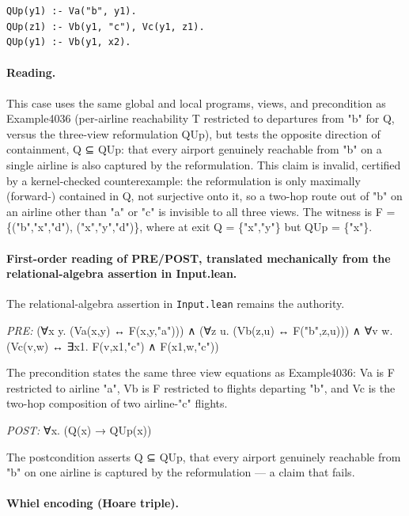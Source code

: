 \documentclass[10pt]{article}
\begin{document}
\begin{Verbatim}[fontsize=\scriptsize,breaklines=true,breakanywhere=true,frame=single,framesep=1.5mm]
QUp(y1) :- Va("b", y1).
QUp(z1) :- Vb(y1, "c"), Vc(y1, z1).
QUp(y1) :- Vb(y1, x2).
\end{Verbatim}

\paragraph{Reading.} This case uses the same global and local programs, views, and precondition as Example4036 (per-airline reachability T restricted to departures from "b" for Q, versus the three-view reformulation QUp), but tests the opposite direction of containment, Q ⊆ QUp: that every airport genuinely reachable from "b" on a single airline is also captured by the reformulation. This claim is invalid, certified by a kernel-checked counterexample: the reformulation is only maximally (forward-) contained in Q, not surjective onto it, so a two-hop route out of "b" on an airline other than "a" or "c" is invisible to all three views. The witness is F = \{("b","x","d"), ("x","y","d")\}, where at exit Q = \{"x","y"\} but QUp = \{"x"\}.

\paragraph{First-order reading of PRE/POST, translated mechanically from the relational-algebra assertion in Input.lean.} The relational-algebra assertion in \texttt{Input.lean} remains the authority.

\textit{PRE:} (∀x y. (Va(x,y) ↔ F(x,y,"a"))) ∧ (∀z u. (Vb(z,u) ↔ F("b",z,u))) ∧ ∀v w. (Vc(v,w) ↔ ∃x1. F(v,x1,"c") ∧ F(x1,w,"c"))\par The precondition states the same three view equations as Example4036: Va is F restricted to airline "a", Vb is F restricted to flights departing "b", and Vc is the two-hop composition of two airline-"c" flights.

\textit{POST:} ∀x. (Q(x) → QUp(x))\par The postcondition asserts Q ⊆ QUp, that every airport genuinely reachable from "b" on one airline is captured by the reformulation --- a claim that fails.

\paragraph{Whiel encoding (Hoare triple).}
\end{document}

